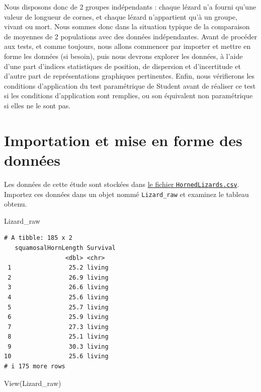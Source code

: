 \documentclass[
  french,
  a4paper,
  DIV=11,
  numbers=noendperiod,
  oneside]{scrreprt}
\newenvironment{Shaded}{}{}
\newcommand{\FunctionTok}[1]{\textcolor[rgb]{0.44,0.26,0.76}{#1}}
\newcommand{\NormalTok}[1]{\textcolor[rgb]{0.14,0.16,0.18}{#1}}
\begin{document}
Nous disposons donc de 2 groupes indépendants : chaque lézard n'a fourni
qu'une valeur de longueur de cornes, et chaque lézard n'appartient qu'à
un groupe, vivant ou mort. Nous sommes donc dans la situation typique de
la comparaison de moyennes de 2 populations avec des données
indépendantes. Avant de procéder aux tests, et comme toujours, nous
allons commencer par importer et mettre en forme les données (si
besoin), puis nous devrons explorer les données, à l'aide d'une part
d'indices statistiques de position, de dispersion et d'incertitude et
d'autre part de représentations graphiques pertinentes. Enfin, nous
vérifierons les conditions d'application du test paramétrique de Student
avant de réaliser ce test si les conditions d'application sont remplies,
ou son équivalent non paramétrique si elles ne le sont pas.

\section{Importation et mise en forme des
données}\label{importation-et-mise-en-forme-des-donnuxe9es-2}

Les données de cette étude sont stockées dans
\href{data/HornedLizards.csv}{le fichier \texttt{HornedLizards.csv}}.
Importez ces données dans un objet nommé \texttt{Lizard\_raw} et
examinez le tableau obtenu.

\begin{Shaded}
\begin{Highlighting}[]
\NormalTok{Lizard\_raw}
\end{Highlighting}
\end{Shaded}

\begin{verbatim}
# A tibble: 185 x 2
   squamosalHornLength Survival
                 <dbl> <chr>   
 1                25.2 living  
 2                26.9 living  
 3                26.6 living  
 4                25.6 living  
 5                25.7 living  
 6                25.9 living  
 7                27.3 living  
 8                25.1 living  
 9                30.3 living  
10                25.6 living  
# i 175 more rows
\end{verbatim}

\begin{Shaded}
\begin{Highlighting}[]
\FunctionTok{View}\NormalTok{(Lizard\_raw)}
\end{Highlighting}
\end{Shaded}
\end{document}
